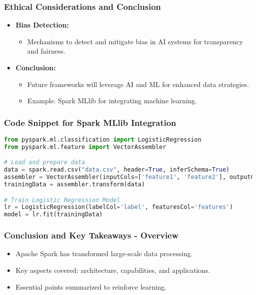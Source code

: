 \documentclass[aspectratio=169]{beamer}
\begin{document}
\begin{frame}[fragile]
  \frametitle{Ethical Considerations and Conclusion}
  \begin{itemize}
    \item \textbf{Bias Detection:}
      \begin{itemize}
        \item Mechanisms to detect and mitigate bias in AI systems for transparency and fairness.
      \end{itemize}
    \item \textbf{Conclusion:}
      \begin{itemize}
        \item Future frameworks will leverage AI and ML for enhanced data strategies.
        \item Example: Spark MLlib for integrating machine learning.
      \end{itemize}
  \end{itemize}
\end{frame}

\begin{frame}[fragile]
  \frametitle{Code Snippet for Spark MLlib Integration}
  \begin{lstlisting}[language=Python]
from pyspark.ml.classification import LogisticRegression
from pyspark.ml.feature import VectorAssembler

# Load and prepare data
data = spark.read.csv("data.csv", header=True, inferSchema=True)
assembler = VectorAssembler(inputCols=['feature1', 'feature2'], outputCol='features')
trainingData = assembler.transform(data)

# Train Logistic Regression Model
lr = LogisticRegression(labelCol='label', featuresCol='features')
model = lr.fit(trainingData)
  \end{lstlisting}
\end{frame}

\begin{frame}[fragile]
    \frametitle{Conclusion and Key Takeaways - Overview}
    \begin{itemize}
        \item Apache Spark has transformed large-scale data processing.
        \item Key aspects covered: architecture, capabilities, and applications.
        \item Essential points summarized to reinforce learning.
    \end{itemize}
\end{frame}
\end{document}
